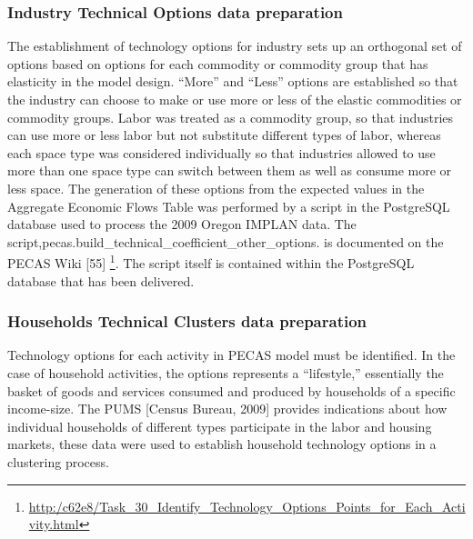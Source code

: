 \subsubsection{Industry Technical Options data preparation}

The establishment of technology options for industry sets up an orthogonal set of options based on options for each commodity or commodity group that has elasticity in the model design. ``More'' and ``Less'' options are established so that the industry can choose to make or use more or less of the elastic commodities or commodity groups.  Labor was treated as a commodity group, so that industries can use more or less labor but not substitute different types of labor, whereas each space type was considered individually so that industries allowed to use more than one space type can switch between them as well as consume more or less space.  The generation of these options from the expected values in the Aggregate Economic Flows Table was performed by a script in the PostgreSQL database used to process the 2009 Oregon IMPLAN data. The script,pecas.build\_technical\_coefficient\_other\_options. is documented on the PECAS Wiki [55] \footnote{\url{http:/c62e8/Task_30_Identify_Technology_Options_Points_for_Each_Activity.html}}. The script itself is contained within the PostgreSQL database that has been delivered.

\subsubsection{Households Technical Clusters data preparation}
Technology options for each activity in PECAS model must be identified. In the case of household activities, the options represents a ``lifestyle,'' essentially the basket of goods and services consumed and produced by households of a specific income-size. The PUMS [Census Bureau, 2009] provides indications about how individual households of different types participate in the labor and housing markets, these data were used to establish household technology options in a clustering process.

